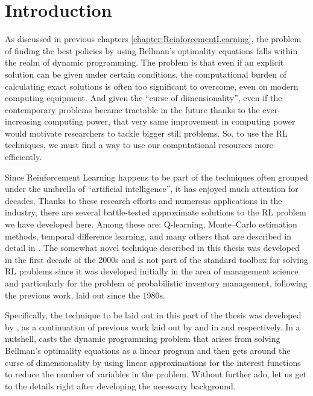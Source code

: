 \section{Introduction}

As discussed in previous chapters \ref{chapter:ReinforcementLearning}, the
problem of finding the best policies by using Bellman's optimality equations
falls within the realm of dynamic programming. The problem is that even if an
explicit solution can be given under certain conditions, the computational
burden of calculating exact solutions is often too significant to overcome, even
on modern computing equipment. And given the ``curse of dimensionality'', even
if the contemporary problems became tractable in the future thanks to the
ever-increasing computing power, that very same improvement in computing power
would motivate researchers to tackle bigger still problems. So, to use the RL
techniques, we must find a way to use our computational resources more
efficiently. 

Since Reinforcement Learning happens to be part of the techniques often grouped
under the umbrella of ``artificial intelligence'', it has enjoyed much attention
for decades. Thanks to these research efforts and numerous applications in the
industry, there are several battle-tested approximate solutions to the RL
problem we have developed here. Among these are: Q-learning, Monte--Carlo
estimation methods, temporal difference learning, and many others that are
described in detail in \cite[Chapter~4]{SuttonBarto}. The somewhat novel
technique described in this thesis was developed in the first decade of the
2000s and is not part of the standard toolbox for solving RL problems since it
was developed initially in the area of management science and particularly for
the problem of probabilistic inventory management, following the previous work,
laid out since the 1980s. 

Specifically, the technique to be laid out in this part of the thesis was
developed by \citeauthor*{farias2003LP2ADP}, as a continuation of previous work
laid out by \citeauthor*{denardo1970} and \citeauthor*{depenoux1963} in
\cite{denardo1970} and \cite{depenoux1963} respectively. In a nutshell,
\citeauthor*{farias2002thesis} casts the dynamic programming problem that arises
from solving Bellman's optimality equations as a linear program and then gets
around the curse of dimensionality by using linear approximations for the
interest functions to reduce the number of variables in the problem. Without
further ado, let us get to the details right after developing the necessary
background.

